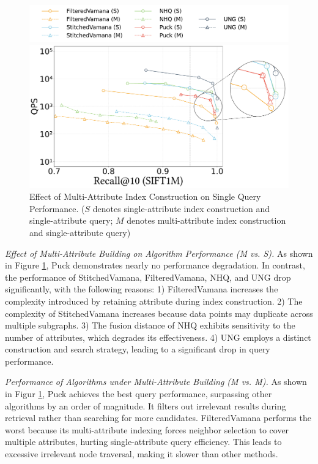 \documentclass[sigconf, nonacm]{acmart}
\begin{document}
\begin{figure}[th]
    \centering
    \setlength{\abovecaptionskip}{0.1cm}
    \setlength{\belowcaptionskip}{-0.1cm}
    \hspace*{15pt} %
    \includegraphics[width=0.98\columnwidth]{figures/exp/exp_2_legend.pdf} %
  
    
    \includegraphics[width=0.8\columnwidth]{figures/exp/exp_2_1.pdf}
    \caption{Effect of Multi-Attribute Index Construction on Single Query Performance. ($S$ denotes single-attribute index construction and single-attribute query; $M$ denotes multi-attribute index construction and single-attribute query)}
    \label{fig:exp_2_1}
    
\end{figure}

\textit{Effect of Multi-Attribute Building on Algorithm Performance (M vs. S).}
As shown in Figure \ref{fig:exp_2_1}, Puck demonstrates nearly no performance degradation. In contrast, the performance of StitchedVamana, FilteredVamana, NHQ, and UNG drop significantly, with the following reasons: 1) FilteredVamana increases the complexity introduced by retaining attribute during index construction. 2) The complexity of StitchedVamana increases because data points may duplicate across multiple subgraphs. 3) The fusion distance of NHQ exhibits sensitivity to the number of attributes, which degrades its effectiveness. 4) UNG employs a distinct construction and search strategy, leading to a significant drop in query performance.



\textit{Performance of Algorithms under Multi-Attribute Building (M vs. M).}  
As shown in Figur \ref{fig:exp_2_1}, Puck achieves the best query performance, surpassing other algorithms by an order of magnitude. It filters out irrelevant results during retrieval rather than searching for more candidates. FilteredVamana performs the worst because its multi-attribute indexing forces neighbor selection to cover multiple attributes, hurting single-attribute query efficiency. This leads to excessive irrelevant node traversal, making it slower than other methods.
\end{document}
